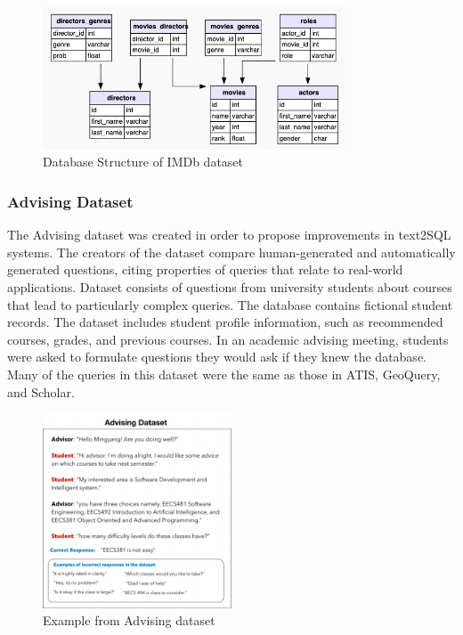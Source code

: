 \begin{figure}[htb]
    \centering
    \includegraphics[width=0.8\textwidth]{pics/db/IMDb.png}
    \caption{Database Structure of IMDb dataset}
    \label{fig:IMDb}
\end{figure}

\newpage %

\subsubsection*{Advising Dataset}

The Advising dataset was created in order to propose improvements in text2SQL systems. The creators of the dataset compare human-generated and automatically generated questions, citing properties of queries that relate to real-world applications. Dataset consists of questions from university students about courses that lead to particularly complex queries. The database contains fictional student records. The dataset includes student profile information, such as recommended courses, grades, and previous courses. In an academic advising meeting, students were asked to formulate questions they would ask if they knew the database. Many of the queries in this dataset were the same as those in ATIS, GeoQuery, and Scholar.

\begin{figure}[htb]
    \centering
    \includegraphics[width=0.5\textwidth]{pics/db/Advising.png}
    \caption{Example from Advising dataset \cite{vig_comparison_2019}}
    \label{fig:Advising}
\end{figure}

